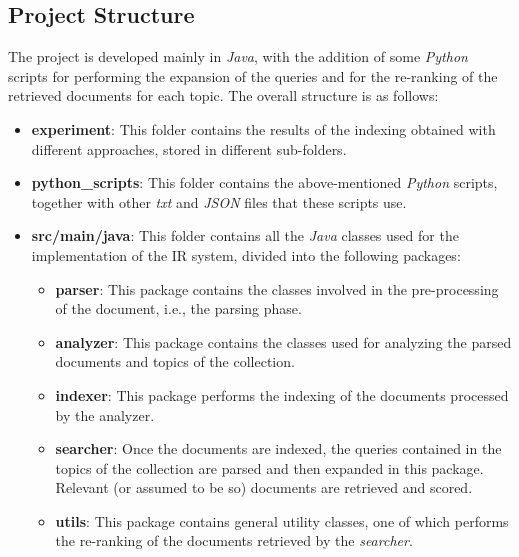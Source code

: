 \subsection{Project Structure}
The project is developed mainly in \textit{Java}, with the addition of some \textit{Python} scripts for performing the expansion of the queries and for the re-ranking of the retrieved documents for each topic. The overall structure is as follows:
\begin{itemize}
    \item \textbf{experiment}: This folder contains the results of the indexing obtained with different approaches, stored in different sub-folders.

    \item \textbf{python\_scripts}: This folder contains the above-mentioned \textit{Python} scripts, together with other \textit{txt} and \textit{JSON} files that these scripts use.

\item \textbf{src/main/java}: This folder contains all the \textit{Java} classes used for the implementation of the \ac{IR} system, divided into the following packages:

\begin{itemize}
    \item \textbf{parser}: This package contains the classes involved in the pre-processing of the document, i.e., the parsing phase.
    
    \item \textbf{analyzer}: This package contains the classes used for analyzing the parsed documents and topics of the collection.
    
    \item \textbf{indexer}: This package performs the indexing of the documents processed by the analyzer.
    
    \item \textbf{searcher}: Once the documents are indexed, the queries contained in the topics of the collection are parsed and then expanded in this package. Relevant (or assumed to be so) documents are retrieved and scored.
    
    \item \textbf{utils}: This package contains general utility classes, one of which performs the re-ranking of the documents retrieved by the \textit{searcher}.

\end{itemize}


\end{itemize}
